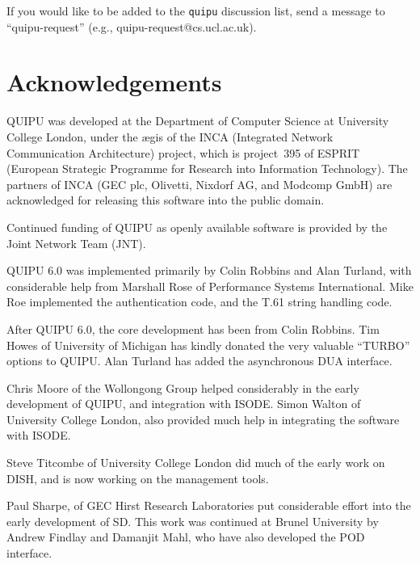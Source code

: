 If you would like to be added to the \verb"quipu" discussion 
list, send a message to 
``quipu-request'' (e.g., quipu-request@cs.ucl.ac.uk).

\section {Acknowledgements}

QUIPU was developed at the Department of Computer Science at University
College London, under the {\ae}gis of the INCA (Integrated Network
Communication Architecture) project, which is project~395
of ESPRIT (European Strategic Programme for Research into
Information Technology).   The partners of INCA (GEC plc,
Olivetti, Nixdorf AG,
and Modcomp GmbH) are acknowledged for releasing this
software into the public domain.

Continued funding of QUIPU as openly available software is provided by the
Joint Network Team (JNT).

QUIPU 6.0 was implemented
primarily by Colin Robbins
and Alan Turland,
with considerable help from Marshall Rose of
Performance Systems International.
Mike Roe  implemented the authentication code, and the 
T.61 string handling code.

After QUIPU 6.0, the core development has been from Colin Robbins.
Tim Howes of University of Michigan has kindly 
donated the very valuable ``TURBO'' options to QUIPU.
Alan Turland has added the asynchronous DUA interface.

Chris Moore of 
the Wollongong Group helped considerably in the early development
of QUIPU, and integration with ISODE.
Simon Walton of University College London,
also provided much help in integrating the software with ISODE.

Steve Titcombe of
University College London did much 
of the early work on DISH, and is now working on the management 
tools.

Paul Sharpe, of GEC Hirst Research Laboratories
put considerable effort into the early development of SD.
This work was continued at Brunel University by
Andrew Findlay and Damanjit Mahl,
who have also developed the POD interface.

